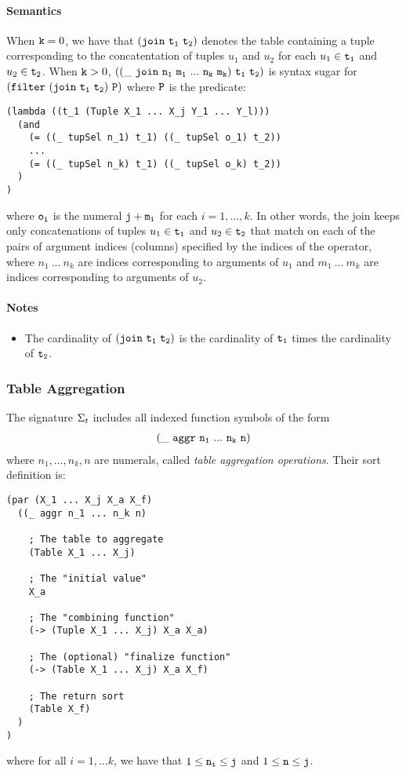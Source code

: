 \documentclass[english,a4paper,10pt]{article}
\begin{document}
\paragraph{Semantics}
When ${\tt k}=0$, we have that $\syntax{(join\ t_1\ t_2)}$
denotes the table containing a tuple corresponding to the concatentation
of tuples $u_1$ and $u_2$
for each $u_1 \in {\tt t_1}$ and $u_2 \in {\tt t_2}$.
When ${\tt k}>0$, $\syntax{((\_\ join\ n_1\ m_1\ ...\ n_k\ m_k)\ t_1\ t_2)}$
is syntax sugar for ${\tt (filter\ (join\ t_1\ t_2)\ P)}$ where ${\tt P}$ is
the predicate:
\begin{verbatim}
(lambda ((t_1 (Tuple X_1 ... X_j Y_1 ... Y_l)))
  (and
    (= ((_ tupSel n_1) t_1) ((_ tupSel o_1) t_2))
    ...
    (= ((_ tupSel n_k) t_1) ((_ tupSel o_k) t_2))
  )
)
\end{verbatim}
where ${\tt o_i}$ is the numeral ${\tt j+m_i}$ for each $i = 1, \ldots, k$.
In other words,
the join keeps only concatenations of tuples $u_1 \in {\tt t_1}$ and
$u_2 \in {\tt t_2}$ 
that match on each of the pairs of argument indices (columns) specified by
the indices of the operator,
where $n_1\ ...\ n_k$ are indices corresponding to arguments of $u_1$
and $m_1\ ...\ m_k$ are indices corresponding to arguments of $u_2$.

\paragraph{Notes}
\begin{itemize}
\item The cardinality of $\syntax{(join\ t_1\ t_2)}$
is the cardinality of ${\tt t_1}$ times the cardinality of ${\tt t_2}$.
\end{itemize}


\subsubsection{Table Aggregation}
The signature $\Sigma_{t}$ includes 
all indexed function symbols of the form
\begin{align*}
{\tt  
(\_\ aggr\ n_1\ ...\ n_k\ n)
}
\end{align*}
where $n_1, \ldots, n_k, n$ are numerals,
called \emph{table aggregation operations}. Their sort definition is:

\begin{verbatim}
(par (X_1 ... X_j X_a X_f) 
  ((_ aggr n_1 ... n_k n)
  
    ; The table to aggregate
    (Table X_1 ... X_j)
    
    ; The "initial value"
    X_a
    
    ; The "combining function"
    (-> (Tuple X_1 ... X_j) X_a X_a)
    
    ; The (optional) "finalize function"
    (-> (Table X_1 ... X_j) X_a X_f)
    
    ; The return sort
    (Table X_f)
  )
)
\end{verbatim}
where for all $i = 1, \ldots k$,
we have that $1 \leq {\tt n_i} \leq {\tt j}$ and $1 \leq {\tt n} \leq {\tt j}$. 
\end{document}
